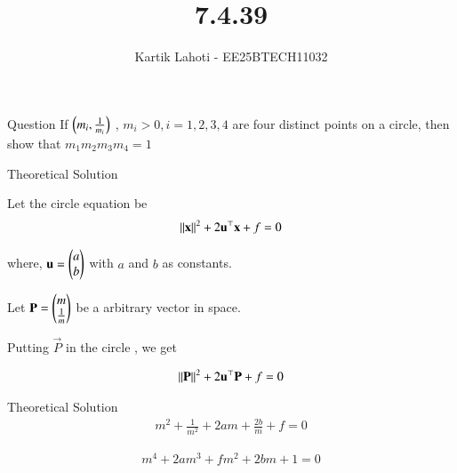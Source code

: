 \documentclass{beamer}
\title %
{7.4.39}
\author 
{Kartik Lahoti - EE25BTECH11032}
\begin{document}
\frame{\titlepage}
\begin{frame}{Question}
If $\left(m_i , \frac{1}{m_i}\right)$ , $m_i > 0 , i = 1, 2,3,4$ are four distinct points on a circle, then show that $m_1m_2m_3m_4 = 1 $
\end{frame}

\begin{frame}{Theoretical Solution}

Let the circle equation be 
\begin{align}
    \left\lVert\mathbf{x}\right\rVert^2 + 2\mathbf{u}^{\top}\mathbf{x} + f = 0 
\end{align}

where, $\mathbf{u} = \begin{pmatrix}a \\ b\end{pmatrix}$ with $a$ and $b$ as constants.

Let $\mathbf{P} = \begin{pmatrix}m \\ \frac{1}{m}\end{pmatrix}$ be a arbitrary vector in space.

Putting $\vec{P}$ in the circle , we get 

\begin{align}
    \left\lVert\mathbf{P}\right\rVert^2 + 2\mathbf{u}^{\top}\mathbf{P} + f = 0 
\end{align}

\end{frame}

\begin{frame}{Theoretical Solution}
\begin{align}
    m^2 + \frac{1}{m^2} + 2am + \frac{2b}{m} + f = 0
\end{align}

\begin{align}
    m^4 + 2am^3 + fm^2 + 2bm + 1 = 0 \label{eq_1}
\end{align}

\end{frame}
\end{document}
